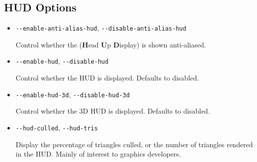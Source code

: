 \begin{itemize}
{\begin{itemize}
  \end{itemize}
}
{
  \subsection{HUD Options}
  \begin{itemize}
  \item{\texttt{-$ $-enable-anti-alias-hud}, \texttt{-$ $-disable-anti-alias-hud}}

  Control whether the  (\textbf{H}ead \textbf{U}p  \textbf{D}isplay) is shown anti-aliased.

  \item{\texttt{-$ $-enable-hud}, \texttt{-$ $-disable-hud}}

  Control whether the HUD is displayed. Defaults to disabled.

  \item{\texttt{-$ $-enable-hud-3d}, \texttt{-$ $-disable-hud-3d}}

  Control whether the 3D HUD is displayed. Defaults to disabled.

  \item{\texttt{-$ $-hud-culled}, \texttt{-$ $-hud-tris}}

  Display the percentage of triangles culled, or the number of triangles rendered in the HUD. Mainly
  of interest to graphics developers.

  \end{itemize}
}

\end{itemize}
